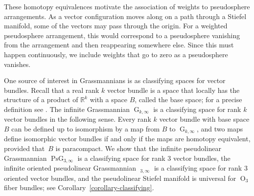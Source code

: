 \documentclass[11pt]{article}
\numberwithin{equation}{section}
\theoremstyle{remark}
\let\mb\mathbb
\DeclareMathOperator{\pg}{PsG}
\DeclareMathOperator{\pog}{Ps\widetilde G}
\DeclareMathOperator{\g}{G}
\DeclareMathOperator{\orth}{O}
\begin{document}
These homotopy equivalences motivate the association of weights to pseudosphere arrangements.
As a vector configuration moves along on a path through a Stiefel manifold, some of the vectors may pass through the origin. For a weighted pseudosphere arrangement, this would correspond to a pseudosphere vanishing from the arrangement and then reappearing somewhere else. Since this must happen continuously, we include weights that go to zero as a pseudosphere vanishes.

One source of interest in Grassmannians is as classifying spaces for vector bundles.
Recall that a real rank $k$ vector bundle is a space that locally has the structure of a product of $\mb{R}^k$ with a space $B$, called the base space; for a precise definition see \cite[p.\,24]{husemoller1994fibre}.
The infinite Grassmannian $\g_{k,\infty}$ is a classifying space for rank $k$ vector bundles in the following sense.
Every rank $k$ vector bundle with base space $B$ can be defined up to isomorphism by a map from $B$ to $\g_{k,\infty}$, and two maps define isomorphic vector bundles if and only if the maps are homotopy equivalent, provided that~$B$ is paracompact.
We show that the infinite pseudolinear Grassmannian $\pg_{3,\infty}$ is a classifying space for rank $3$ vector bundles, the infinite oriented pseudolinear Grassmannian $\pog_{3,\infty}$ is a classifying space for rank $3$ oriented vector bundles, and the pseudolinear Stiefel manifold is universal for $\orth_3$ fiber bundles; see Corollary~\ref{corollary-classifying}.
\end{document}

